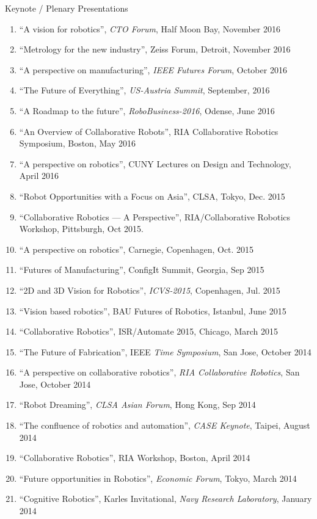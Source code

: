 \documentclass{article}
\begin{document}
\begin{cv}
\begin{cvlist}{Keynote / Plenary Presentations}
\begin{enumerate}
			\item ``A vision for robotics'', {\em CTO Forum}, Half Moon Bay, November 2016
			\item ``Metrology for the new industry'', Zeiss Forum, Detroit,  November 2016
			\item ``A perspective on manufacturing'', {\em IEEE Futures Forum},  October 2016
			\item ``The Future of Everything'', {\em US-Austria Summit},  September, 2016
			\item ``A Roadmap to the future'', {\em RoboBusiness-2016}, Odense,  June 2016
			\item ``An Overview of Collaborative Robots'', RIA Collaborative Robotics Symposium, Boston, May 2016
			\item ``A perspective on robotics'', CUNY Lectures on Design and Technology, April 2016
			\item ``Robot Opportunities with a Focus on Asia'', CLSA, Tokyo,  Dec. 2015
			\item ``Collaborative Robotics --- A Perspective'', RIA/Collaborative Robotics Workshop, Pittsburgh, Oct 2015.
			\item ``A perspective on robotics'', Carnegie, Copenhagen, Oct. 2015
			\item ``Futures of Manufacturing'', ConfigIt Summit, Georgia, Sep 2015
			\item ``2D and 3D Vision for Robotics'', {\em ICVS-2015}, Copenhagen, Jul. 2015
			\item ``Vision based robotics'', BAU Futures of Robotics, Istanbul, June 2015
			\item ``Collaborative Robotics'', ISR/Automate 2015, Chicago, March 2015
			\item ``The Future of Fabrication'', IEEE {\em Time Symposium}, San Jose, October 2014
			\item ``A perspective on collaborative robotics'', {\em RIA Collaborative Robotics}, San Jose, October 2014
			\item ``Robot Dreaming'', {\em CLSA Asian Forum}, Hong Kong, Sep 2014
			\item ``The confluence of robotics and automation'', {\em CASE Keynote}, Taipei, August 2014
			\item ``Collaborative Robotics'', RIA Workshop, Boston, April 2014
			\item ``Future opportunities in Robotics'', {\em Economic Forum}, Tokyo, March 2014
			\item ``Cognitive Robotics'', Karles Invitational, {\em Navy Research Laboratory}, January 2014

\end{enumerate}
\end{cvlist}
\end{cv}
\end{document}
